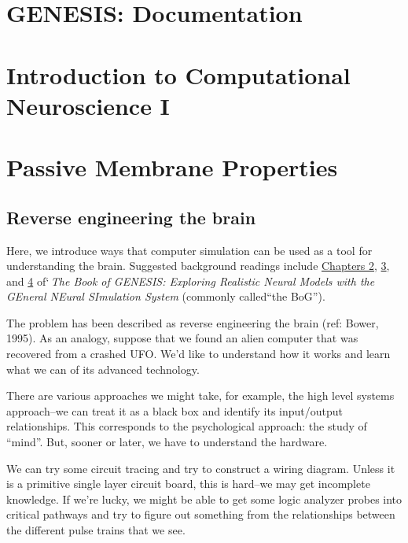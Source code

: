 \documentclass[12pt]{article}
\begin{document}
\section*{GENESIS: Documentation}

\section*{Introduction to Computational Neuroscience I}

\section*{Passive Membrane Properties}

\subsection*{Reverse engineering the brain}

Here, we introduce ways that computer simulation can be used as a tool for understanding the brain. Suggested background readings include \href{../bog-ch2/bog-ch2.pdf}{Chapters 2}, \href{../bog-ch3/bog-ch3.pdf}{3}, and \href{../bog-ch4/bog-ch4.pdf}{4} of`{\it\,The Book of GENESIS: Exploring Realistic Neural Models with the GEneral NEural SImulation System} (commonly called``the BoG''). 

The problem has been described as reverse engineering the brain (ref: Bower, 1995). As an analogy, suppose that we found an alien computer that was recovered from a crashed UFO. We'd like to understand how it works and learn what we can of its advanced technology.

There are various approaches we might take, for example, the high level systems approach--we can treat it as a black box and identify its input/output relationships. This corresponds to the psychological approach: the study of ``mind''. But, sooner or later, we have to understand the hardware.

We can try some circuit tracing and try to construct a wiring diagram. Unless it is a primitive single layer circuit board, this is hard--we may get incomplete knowledge. If we're lucky, we might be able to get some logic analyzer probes into critical pathways and try to figure out something from the relationships between the different pulse trains that we see.
\end{document}
